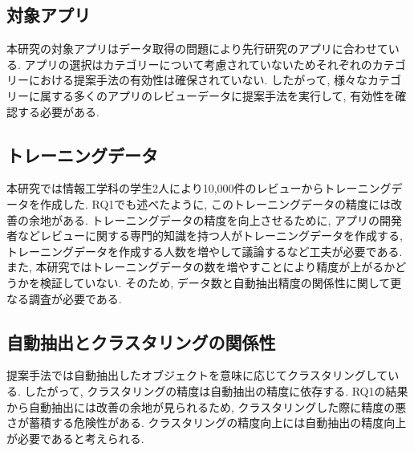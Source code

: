 \subsection{対象アプリ}
本研究の対象アプリはデータ取得の問題により先行研究のアプリに合わせている. アプリの選択はカテゴリーについて考慮されていないためそれぞれのカテゴリーにおける提案手法の有効性は確保されていない. 
したがって, 様々なカテゴリーに属する多くのアプリのレビューデータに提案手法を実行して, 有効性を確認する必要がある. 

\subsection{トレーニングデータ}
本研究では情報工学科の学生2人により10,000件のレビューからトレーニングデータを作成した. RQ1でも述べたように, このトレーニングデータの精度には改善の余地がある. 
トレーニングデータの精度を向上させるために, アプリの開発者などレビューに関する専門的知識を持つ人がトレーニングデータを作成する, トレーニングデータを作成する人数を増やして議論するなど工夫が必要である. 
また, 本研究ではトレーニングデータの数を増やすことにより精度が上がるかどうかを検証していない. そのため, データ数と自動抽出精度の関係性に関して更なる調査が必要である. 

\subsection{自動抽出とクラスタリングの関係性}
提案手法では自動抽出したオブジェクトを意味に応じてクラスタリングしている. したがって, クラスタリングの精度は自動抽出の精度に依存する. 
RQ1の結果から自動抽出には改善の余地が見られるため, クラスタリングした際に精度の悪さが蓄積する危険性がある. クラスタリングの精度向上には自動抽出の精度向上が必要であると考えられる. 
